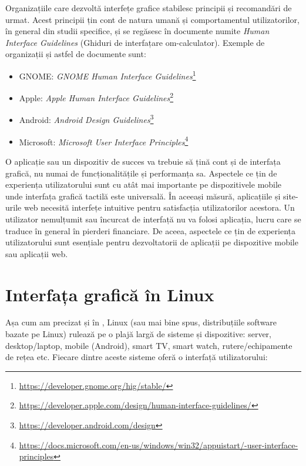 Organizațiile care dezvoltă interfețe grafice stabilesc principii și recomandări de urmat. Acest principii țin cont de natura umană și comportamentul utilizatorilor, în general din studii specifice, și se regăsesc în documente numite \textit{Human Interface Guidelines} (Ghiduri de interfațare om-calculator). Exemple de organizații și astfel de documente sunt:

\begin{itemize}
  \item GNOME: \textit{GNOME Human Interface Guidelines}\footnote{\url{https://developer.gnome.org/hig/stable/}}
  \item Apple: \textit{Apple Human Interface Guidelines}\footnote{\url{https://developer.apple.com/design/human-interface-guidelines/}}
  \item Android: \textit{Android Design Guidelines}\footnote{\url{https://developer.android.com/design}}
  \item Microsoft: \textit{Microsoft User Interface Principles}\footnote{\url{https://docs.microsoft.com/en-us/windows/win32/appuistart/-user-interface-principles}}
\end{itemize}

O aplicație sau un dispozitiv de succes va trebuie să țină cont și de interfața grafică, nu numai de funcționalitățile și performanța sa. Aspectele ce țin de experiența utilizatorului sunt cu atât mai importante pe dispozitivele mobile unde interfața grafică tactilă este universală. În aceeași măsură, aplicațiile și site-urile web necesită interfețe intuitive pentru satisfacția utilizatorilor acestora. Un utilizator nemulțumit sau încurcat de interfață nu va folosi aplicația, lucru care se traduce în general în pierderi financiare. De aceea, aspectele ce țin de experiența utilizatorului sunt esențiale pentru dezvoltatorii de aplicații pe dispozitive mobile sau aplicații web.

\section{Interfața grafică în Linux}
\label{sec:ui:linux-gui}

Așa cum am precizat și în , Linux (sau mai bine spus, distribuțiile software bazate pe Linux) rulează pe o plajă largă de sisteme și dispozitive: server, desktop/laptop, mobile (Android), smart TV, smart watch, rutere/echipamente de rețea etc. Fiecare dintre aceste sisteme oferă o interfață utilizatorului:

